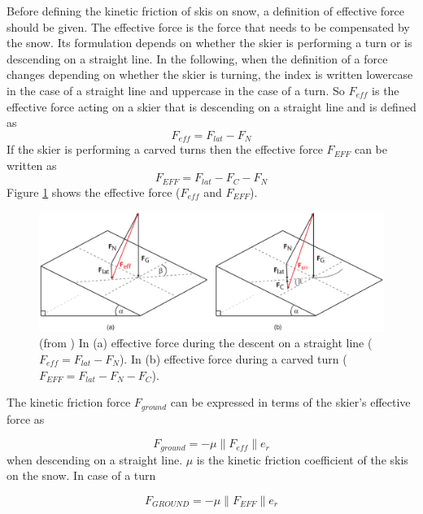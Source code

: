 \documentclass[12pt,a4paper,twoside]{book}
\newcommand{\norm}[1]{\lVert#1\rVert}
\begin{document}
Before defining the kinetic friction of skis on snow, a definition of effective force should be given. The effective force is the force that needs to be compensated by the snow. Its formulation depends on whether the skier is performing a turn or is descending on a straight line. In the following, when the definition of a force changes depending on whether the skier is turning, the index is written lowercase in the case of a straight line and uppercase in the case of a turn. So $F_{eff}$ is the effective force acting on a skier that is descending on a straight line and is defined as
\begin{equation}
F_{eff}=F_{lat}-F_N
\end{equation}
If the skier is performing a carved turns then the effective force $F_{EFF}$ can be written as
\begin{equation}
F_{EFF}=F_{lat}-F_C-F_N
\end{equation}
Figure \ref{effective_force_pic} shows the effective force ($F_{eff}$ and $F_{EFF}$).

\begin{figure}
  \begin{center}
    \includegraphics[width=\textwidth]{images/figure6.eps}
    \caption{(from \cite{hol2012}) In (a) effective force during the descent on a straight line ($F_{eff}=F_{lat}-F_N$). In (b) effective force during a carved turn ($F_{EFF}=F_{lat}-F_N-F_C$).}\label{effective_force_pic}
  \end{center}
\end{figure}

The kinetic friction force $F_{ground}$ can be expressed in terms of the skier's effective force as

\begin{equation}
F_{ground}=-\mu \norm{F_{eff}}e_{\dot{r}}
\end{equation}
when descending on a straight line. $\mu$ is the kinetic friction coefficient of the skis on the snow. In case of a turn

\begin{equation}
F_{GROUND}=-\mu \norm{F_{EFF}}e_{\dot{r}}
\end{equation}
\end{document}
